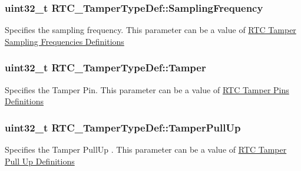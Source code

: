 \subsubsection[{\texorpdfstring{Sampling\+Frequency}{SamplingFrequency}}]{\setlength{\rightskip}{0pt plus 5cm}uint32\+\_\+t R\+T\+C\+\_\+\+Tamper\+Type\+Def\+::\+Sampling\+Frequency}\hypertarget{struct_r_t_c___tamper_type_def_a1822a9001e16621e16cd87b065b92e2a}{}\label{struct_r_t_c___tamper_type_def_a1822a9001e16621e16cd87b065b92e2a}
Specifies the sampling frequency. This parameter can be a value of \hyperlink{group___r_t_c_ex___tamper___sampling___frequencies___definitions}{R\+TC Tamper Sampling Frequencies Definitions} 
\subsubsection[{\texorpdfstring{Tamper}{Tamper}}]{\setlength{\rightskip}{0pt plus 5cm}uint32\+\_\+t R\+T\+C\+\_\+\+Tamper\+Type\+Def\+::\+Tamper}\hypertarget{struct_r_t_c___tamper_type_def_a72b82da6f13071bcc8cb68276daf3c5e}{}\label{struct_r_t_c___tamper_type_def_a72b82da6f13071bcc8cb68276daf3c5e}
Specifies the Tamper Pin. This parameter can be a value of \hyperlink{group___r_t_c_ex___tamper___pins___definitions}{R\+TC Tamper Pins Definitions} 
\subsubsection[{\texorpdfstring{Tamper\+Pull\+Up}{TamperPullUp}}]{\setlength{\rightskip}{0pt plus 5cm}uint32\+\_\+t R\+T\+C\+\_\+\+Tamper\+Type\+Def\+::\+Tamper\+Pull\+Up}\hypertarget{struct_r_t_c___tamper_type_def_a6e849894076222b74c7fa8430b6e176c}{}\label{struct_r_t_c___tamper_type_def_a6e849894076222b74c7fa8430b6e176c}
Specifies the Tamper Pull\+Up . This parameter can be a value of \hyperlink{group___r_t_c_ex___tamper___pull___u_p___definitions}{R\+TC Tamper Pull Up Definitions} 
